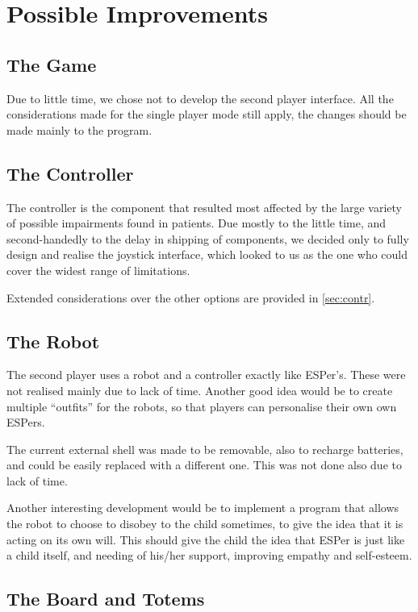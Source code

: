 \documentclass[a4paper,twoside]{book}
\begin{document}
\section{Possible Improvements}

\subsection*{The Game}

Due to little time, we chose not to develop the second player interface. All the considerations made for the single player mode still apply, the changes should be made mainly to the program.

\subsection*{The Controller}

The controller is the component that resulted most affected by the large variety of possible impairments found in patients. Due mostly to the little time, and second-handedly to the delay in shipping of components, we decided only to fully design and realise the joystick interface, which looked to us as the one who could cover the widest range of limitations.

Extended considerations over the other options are provided in \autoref{sec:contr}.

\subsection*{The Robot}

The second player uses a robot and a controller exactly like ESPer's. These were not realised mainly due to lack of time. Another good idea would be to create multiple \textquotedblleft{}outfits\textquotedblright{} for the robots, so that players can  personalise their own own ESPers.

The current external shell was made to be removable, also to recharge batteries, and could be easily replaced with a different one. This was not done also due to lack of time. 

Another interesting development would be to implement a program that allows the robot to choose to disobey to the child sometimes, to give the idea that it is acting on its own will. This should give the child the idea that ESPer is just like a child itself, and needing of his/her support, improving empathy and self-esteem.

\subsection*{The Board and Totems}
\end{document}
